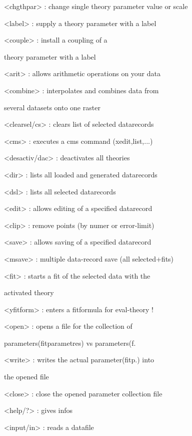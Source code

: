 \documentclass[]{article}
\begin{document}
\textless{}chgthpar\textgreater{} : change single theory parameter value
or scale

\textless{}label\textgreater{} : supply a theory parameter with a label

\textless{}couple\textgreater{} : install a coupling of a

theory parameter with a label

\textless{}arit\textgreater{} : allows arithmetic operations on your
data

\textless{}combine\textgreater{} : interpolates and combines data from

several datasets onto one raster

\textless{}clearsel/cs\textgreater{} : clears list of selected
datarecords

\textless{}cms\textgreater{} : executes a cms command (xedit,list,...)

\textless{}desactiv/dac\textgreater{} : deactivates all theories

\textless{}dir\textgreater{} : lists all loaded and generated
datarecords

\textless{}dsl\textgreater{} : lists all selected datarecords

\textless{}edit\textgreater{} : allows editing of a specified datarecord

\textless{}clip\textgreater{} : remove points (by numer or error-limit)

\textless{}save\textgreater{} : allows saving of a specified datarecord

\textless{}msave\textgreater{} : multiple data-record save (all
selected+fits)

\textless{}fit\textgreater{} : starts a fit of the selected data with
the

activated theory

\textless{}yfitform\textgreater{} : enters a fitformula for eval-theory
!

\textless{}open\textgreater{} : opens a file for the collection of

parameters(fitparametres) vs parameters(f.

\textless{}write\textgreater{} : writes the actual parameter(fitp.) into

the opened file

\textless{}close\textgreater{} : close the opened parameter collection
file

\textless{}help/?\textgreater{} : gives infos

\textless{}input/in\textgreater{} : reads a datafile
\end{document}
